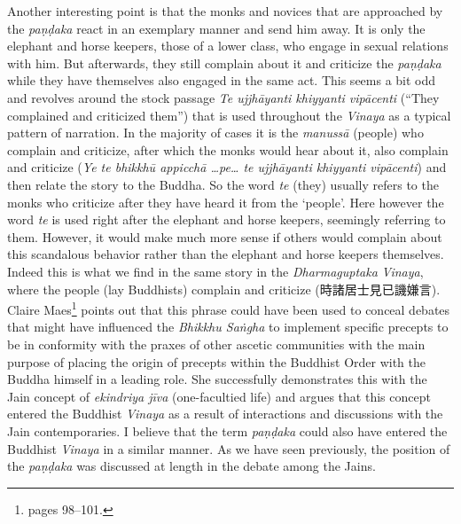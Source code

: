 Another interesting point is that the monks and novices that are approached by the {\em paṇḍaka} react in an exemplary manner and send him away. It is only the elephant and horse keepers, those of a lower class, who engage in sexual relations with him. But afterwards, they still complain about it and criticize the {\em paṇḍaka} while they have themselves also engaged in the same act. This seems a bit odd and revolves around the stock passage {\em Te ujjhāyanti khiyyanti vipācenti} (``They complained and criticized them'') that is used throughout the {\em Vinaya} as a typical pattern of narration. In the majority of cases it is the {\em manussā} (people) who complain and criticize, after which the monks would hear about it, also complain and criticize ({\em Ye te bhikkhū appicchā …pe… te ujjhāyanti khiyyanti vipācenti}) and then relate the story to the Buddha. So the word {\em te} (they) usually refers to the monks who criticize after they have heard it from the `people'. Here however the word {\em te} is used right after the elephant and horse keepers, seemingly referring to them. However, it would make much more sense if others would complain about this scandalous behavior rather than the elephant and horse keepers themselves. Indeed this is what we find in the same story in the {\em Dharmaguptaka} {\em Vinaya}, where the people (lay Buddhists) complain and criticize (時諸居士見已譏嫌言). Claire Maes\footnote{\cite{maes2011} pages 98–101.} points out that this phrase could have been used to conceal debates that might have influenced the {\em Bhikkhu Saṅgha} to implement specific precepts to be in conformity with the praxes of other ascetic communities with the main purpose of placing the origin of precepts within the Buddhist Order with the Buddha himself in a leading role. She successfully demonstrates this with the Jain concept of {\em ekindriya jīva} (one-facultied life) and argues that this concept entered the Buddhist {\em Vinaya} as a result of interactions and discussions with the Jain contemporaries. I believe that the term {\em paṇḍaka} could also have entered the Buddhist {\em Vinaya} in a similar manner. As we have seen previously, the position of the {\em paṇḍaka} was discussed at length in the debate among the Jains.

